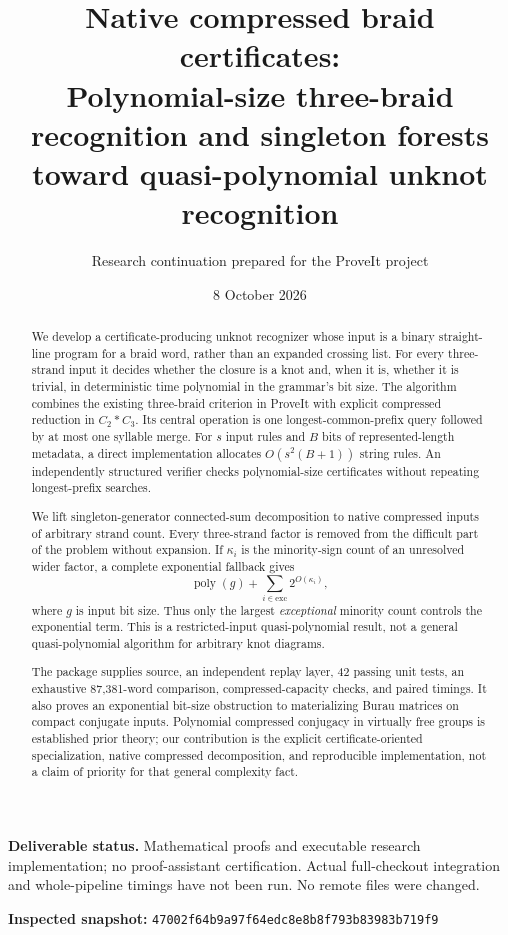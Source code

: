 \documentclass[11pt,letterpaper]{article}
\title{Native compressed braid certificates:\\Polynomial-size three-braid recognition and singleton forests\\toward quasi-polynomial unknot recognition}
\author{Research continuation prepared for the ProveIt project}
\date{8 October 2026}
\theoremstyle{definition}\newtheorem{definition}[theorem]{Definition}
\theoremstyle{remark}\newtheorem{remark}[theorem]{Remark}
\newcommand{\poly}{\operatorname{poly}}
\newcommand{\exc}{\mathrm{exc}}
\newcommand{\sha}{\texttt{47002f64b9a97f64edc8e8b8f793b83983b719f9}}
\begin{document}
\maketitle
\begin{abstract}
We develop a certificate-producing unknot recognizer whose input is a binary straight-line program for a braid word, rather than an expanded crossing list. For every three-strand input it decides whether the closure is a knot and, when it is, whether it is trivial, in deterministic time polynomial in the grammar's bit size. The algorithm combines the existing three-braid criterion in ProveIt with explicit compressed reduction in $C_2*C_3$. Its central operation is one longest-common-prefix query followed by at most one syllable merge. For $s$ input rules and $B$ bits of represented-length metadata, a direct implementation allocates $O(s^2(B+1))$ string rules. An independently structured verifier checks polynomial-size certificates without repeating longest-prefix searches.

We lift singleton-generator connected-sum decomposition to native compressed inputs of arbitrary strand count. Every three-strand factor is removed from the difficult part of the problem without expansion. If $\kappa_i$ is the minority-sign count of an unresolved wider factor, a complete exponential fallback gives
\[
 \poly(g)+\sum_{i\in\exc}2^{O(\kappa_i)},
\]
where $g$ is input bit size. Thus only the largest \emph{exceptional} minority count controls the exponential term. This is a restricted-input quasi-polynomial result, not a general quasi-polynomial algorithm for arbitrary knot diagrams.

The package supplies source, an independent replay layer, 42 passing unit tests, an exhaustive 87,381-word comparison, compressed-capacity checks, and paired timings. It also proves an exponential bit-size obstruction to materializing Burau matrices on compact conjugate inputs. Polynomial compressed conjugacy in virtually free groups is established prior theory; our contribution is the explicit certificate-oriented specialization, native compressed decomposition, and reproducible implementation, not a claim of priority for that general complexity fact.
\end{abstract}
\vspace{4pt}
\noindent\textbf{Deliverable status.} Mathematical proofs and executable research implementation; no proof-assistant certification. Actual full-checkout integration and whole-pipeline timings have not been run. No remote files were changed.
\par\smallskip\noindent\textbf{Inspected snapshot:} \sha
\clearpage
\begingroup\small
\tableofcontents
\endgroup
\clearpage
\end{document}
